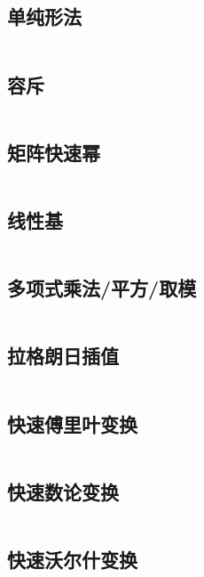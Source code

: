 \inputminted{java}{code/BigIntegerSqrt.java}

\subsection{单纯形法} 

\inputminted{cpp}{code/simplex.cc}

\subsection{容斥} 

\inputminted{cpp}{code/rongchi.cc}

\subsection{矩阵快速幂} 

\inputminted{cpp}{code/矩阵快速幂.cc}

\subsection{	线性基} 

\inputminted{cpp}{code/线性基.cc}

\subsection{多项式乘法/平方/取模} 

\inputminted{cpp}{code/fft_namespace.cc}

\subsection{拉格朗日插值} 

\inputminted{cpp}{code/拉格朗日插值.cc}

\subsection{快速傅里叶变换} 

\inputminted{cpp}{code/fft.cc}

\subsection{快速数论变换} 

\inputminted{cpp}{code/ntt.cc}

\subsection{快速沃尔什变换} 

